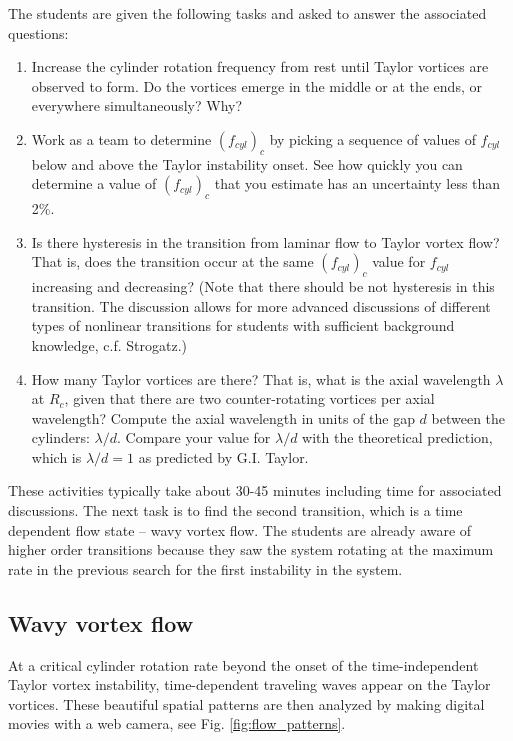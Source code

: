 \documentclass[%
reprint,
 amsmath,amssymb,
 aps,
prb,
floatfix,
longbibliography,
notitlepage
]{revtex4-1}
\begin{document}
The students are given the following tasks and asked to answer the associated questions:
\begin{enumerate}
\item  Increase the cylinder rotation frequency from rest until Taylor vortices are observed to form.  Do the vortices emerge in the middle or at the ends, or everywhere simultaneously? Why? 
\item  Work as a team to determine $(f_{cyl})_c$ by picking a sequence of values of 
$f_{cyl}$ below and above the Taylor instability onset.  See how quickly you can determine a value of $(f_{cyl})_c$ that you estimate has an uncertainty less than 2\%. 
\item Is there hysteresis in the transition from laminar flow to Taylor vortex flow? That is, does the transition occur at the same  $(f_{cyl})_c$ value for $f_{cyl}$ increasing and decreasing? (Note that there should be not hysteresis in this transition. The discussion allows for more advanced discussions of different types of nonlinear transitions for students with sufficient background knowledge, c.f. Strogatz.\cite{strogatz})
\item  How many Taylor vortices are there? That is, what is the axial wavelength $\lambda$ at  $R_c$, given that there are two counter-rotating vortices per axial wavelength?  Compute the axial wavelength in units of the gap $d$ between the cylinders:  $\lambda/d$. Compare your value for $\lambda/d$ with the theoretical prediction, which is $\lambda/d=1$ as predicted by G.I. Taylor.\cite{taylor}
\end{enumerate}

These activities typically take about 30-45 minutes including time for associated discussions. The next task is to find the second transition, which is a time dependent flow state -- wavy vortex flow. The students are already aware of higher order transitions because they saw the system rotating at the maximum rate in the previous search for the first instability in the system.   

\subsection{Wavy vortex flow}

At a critical cylinder rotation rate beyond the onset of the  time-independent Taylor vortex instability, time-dependent traveling waves appear on the Taylor vortices. These beautiful spatial patterns are then analyzed by making digital movies with a web camera, see Fig. \ref{fig:flow_patterns}.
\end{document}
